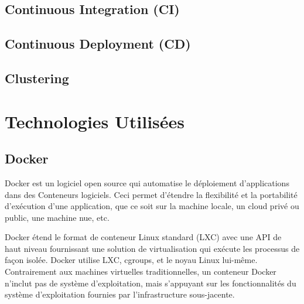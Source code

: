 \documentclass[a4paper,11pt,oneside]{report}
\begin{document}
\subsection{Continuous Integration (CI)}

\subsection{Continuous Deployment (CD)}

\subsection{Clustering}

\section{Technologies Utilisées}

\subsection{Docker} \label{docker}
Docker est un logiciel open source qui automatise le déploiement d'applications dans des Conteneurs logiciels. Ceci permet d'étendre la flexibilité et la portabilité d’exécution d'une application, que ce soit sur la machine locale, un cloud privé ou public, une machine nue, etc. 
\newline

Docker étend le format de conteneur Linux standard (LXC) avec une API de haut niveau fournissant une solution de virtualisation qui exécute les processus de façon isolée. Docker utilise LXC, cgroups, et le noyau Linux lui-même. Contrairement aux machines virtuelles traditionnelles, un conteneur Docker n'inclut pas de système d'exploitation,  mais s'appuyant sur les fonctionnalités du système d’exploitation fournies par l'infrastructure sous-jacente.
\end{document}
